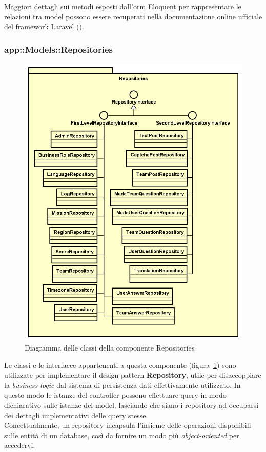 Maggiori dettagli sui metodi esposti dall'\gls{orm}\glsfirstoccur{} Eloquent per rappresentare le relazioni tra model possono essere recuperati nella documentazione online ufficiale del framework Laravel (\cite{site:laravel-doc}).


\subsubsection{app::Models::Repositories} %

\begin{figure}[H]
	\centering
  \includegraphics[scale=0.6]{immagini/components/repositories_diagram.png}
  \caption{Diagramma delle classi della componente Repositories}
	\label{fig:repositories} 
\end{figure}

Le classi e le interfacce appartenenti a questa componente (figura~\ref{fig:repositories}) sono utilizzate per implementare il design pattern \textbf{Repository}, utile per disaccoppiare la \textit{business logic} dal sistema di persistenza dati effettivamente utilizzato. In questo modo le istanze del controller possono effettuare query in modo dichiarativo sulle istanze del model, lasciando che siano i repository ad occuparsi dei dettagli implementativi delle query stesse. \\
Concettualmente, un repository incapsula l'insieme delle operazioni disponibili sulle entità di un database, così da fornire un modo più \textit{object-oriented} per accedervi.\bigskip

